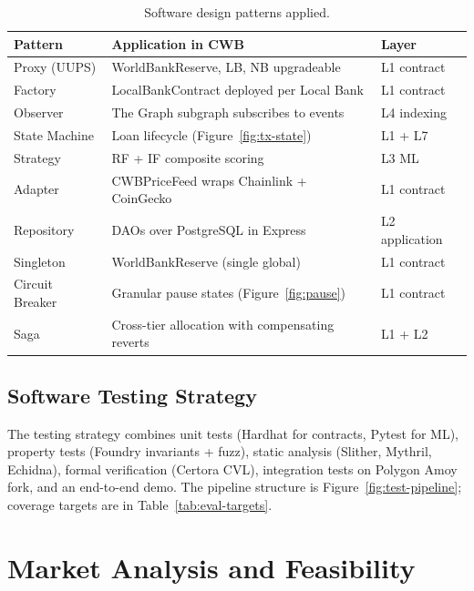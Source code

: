 \documentclass[12pt,a4paper]{report}
\begin{document}
\begin{table}[!t]
\centering
\caption{Software design patterns applied.}
\label{tab:patterns}
\small
\begin{tabularx}{\linewidth}{@{}lYY@{}}
\toprule
\textbf{Pattern} & \textbf{Application in CWB} & \textbf{Layer} \\
\midrule
Proxy (UUPS) & WorldBankReserve, LB, NB upgradeable & L1 contract \\
Factory & LocalBankContract deployed per Local Bank & L1 contract \\
Observer & The Graph subgraph subscribes to events & L4 indexing \\
State Machine & Loan lifecycle (Figure~\ref{fig:tx-state}) & L1 + L7 \\
Strategy & RF + IF composite scoring & L3 ML \\
Adapter & CWBPriceFeed wraps Chainlink + CoinGecko & L1 contract \\
Repository & DAOs over PostgreSQL in Express & L2 application \\
Singleton & WorldBankReserve (single global) & L1 contract \\
Circuit Breaker & Granular pause states (Figure~\ref{fig:pause}) & L1 contract \\
Saga & Cross-tier allocation with compensating reverts & L1 + L2 \\
\bottomrule
\end{tabularx}
\end{table}

\section{Software Testing Strategy}
\label{sec:testing-strategy}

The testing strategy combines unit tests (Hardhat for contracts, Pytest for ML), property tests (Foundry invariants + fuzz), static analysis (Slither, Mythril, Echidna), formal verification (Certora CVL), integration tests on Polygon Amoy fork, and an end-to-end demo. The pipeline structure is Figure~\ref{fig:test-pipeline}; coverage targets are in Table~\ref{tab:eval-targets}.

\chapter{Market Analysis and Feasibility}
\label{ch:market}
\end{document}
